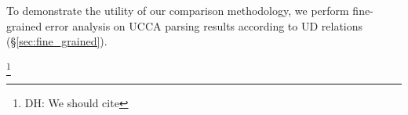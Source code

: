 \documentclass[11pt,a4paper]{article}
\newcommand{\daniel}[1]{\footnote{\color{blue}DH: #1}}
\begin{document}
  
  To demonstrate the utility of our comparison methodology,
  we perform fine-grained error analysis on UCCA parsing results
  according to UD relations (\S\ref{sec:fine_grained}).


\daniel{We should cite }

\end{document}
